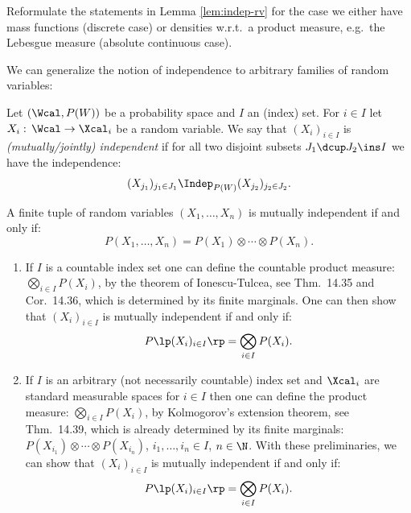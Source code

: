 \begin{Exc}
    Reformulate the statements in Lemma \ref{lem:indep-rv} for the case we either have mass functions (discrete case) 
    or densities w.r.t.\ a product measure, e.g.\ the Lebesgue measure (absolute continuous case).
\end{Exc}


We can generalize the notion of independence to arbitrary families of random variables:

\begin{Def}
    Let $(\Wcal,P(W))$ be a probability space and $I$ an (index) set. For $i \in I$ let $X_i:\, \Wcal \to \Xcal_i$ be 
    a random variable. We say that $(X_i)_{i \in I}$ is \emph{(mutually/jointly) independent}  if
    for all two disjoint subsets $J_1 \dcup J_2 \ins I$ we have the independence:
    \[ (X_{j_1})_{j_1 \in J_1} \Indep_{P(W)} (X_{j_2})_{j_2 \in J_2}.\]
\end{Def}

\begin{Exc}
    A finite tuple of random variables $(X_1,\dots,X_n)$ is mutually independent if and only if:
    \[ P(X_1,\dots,X_n) = P(X_1) \otimes \cdots \otimes P(X_n).\]
\end{Exc}

\begin{Rem}
    \begin{enumerate}
        \item If $I$ is a countable index set one can define the countable product measure: $\bigotimes_{ i \in I} P(X_i)$, by the theorem of Ionescu-Tulcea, see \cite{Kle20} Thm.\ 14.35 and
    Cor.\ 14.36, which is determined by its finite marginals. 
    One can then show that $(X_i)_{i \in I}$ is mutually independent if and only if:
    \[ P\lp (X_i)_{i \in I} \rp = \bigotimes_{ i \in I} P(X_i).\]
\item If $I$ is an arbitrary (not necessarily countable) index set and $\Xcal_i$ are standard measurable spaces for $i \in I$ then one can define the product measure: $\bigotimes_{ i \in I} P(X_i)$, by Kolmogorov's extension theorem, see \cite{Kle20} Thm.\ 14.39, which is already determined by its finite marginals: $P(X_{i_1}) \otimes \cdots \otimes P(X_{i_n})$, $i_1,\dots,i_n \in I$, $n \in \N$. With these preliminaries, we can show that $(X_i)_{i \in I}$ is mutually independent if and only if:
    \[ P\lp (X_i)_{i \in I} \rp = \bigotimes_{ i \in I} P(X_i).\]

    \end{enumerate}
\end{Rem}

